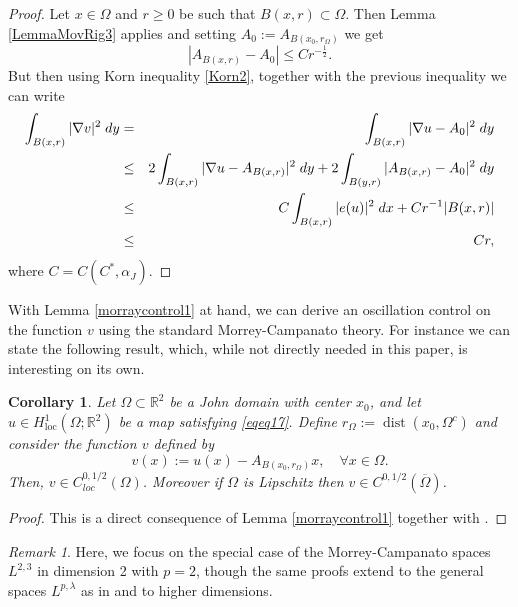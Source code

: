 \documentclass[12pt]{article}
\newtheorem{corollary}[theorem]{Corollary}
\theoremstyle{definition}
\theoremstyle{remark}
\newtheorem{remark}[theorem]{Remark}
\numberwithin{equation}{section}
\DeclareMathOperator{\dist}{dist}
\newcommand{\R}{\mathbb{R}}
\begin{document}
\begin{proof} Let $x\in \Omega$ and $r\geq 0$ be such that $B(x,r)\subset \Omega$. Then Lemma \ref{LemmaMovRig3} applies and setting $A_0:=A_{B(x_0, r_\Omega)}$ we get
    \[ |A_{B(x,r)} - A_{0}|\leq Cr^{-\frac{1}{2}}.\]
    But then using Korn inequality \eqref{Korn2}, together with the previous inequality we can write
    \begin{eqnarray}
        \int_{B(x,r)}|\nabla v|^2 \; dy &=&\int_{B(x,r)}|\nabla u -A_{0}|^2 \; dy  \notag \\
                                        &\leq & 2 \int_{B(x,r)}|\nabla u -A_{B(x,r)}|^2 \; dy +2 \int_{B(y,r)}| A_{B(x,r)}-A_{0}|^2 \; dy  \notag \\
                                        &\leq &  C \int_{B(x,r)}|e(u)|^2 \; dx +  C r^{-1} |B(x,r)| \notag \\
                                        &\leq & C r,
    \end{eqnarray}
    where $C=C( C^*,\alpha_J)$. 
\end{proof}

With Lemma \ref{morraycontrol1} at hand, we can derive an oscillation control on the function $v$ using the standard
Morrey-Campanato theory. For instance we can state the following result, which, while not directly needed in this paper,
is interesting on its own.

\begin{corollary}\label{cor_morrey}
    Let $\Omega \subset \R^2$ be a John domain with center $x_0$, and let $u \in H^1_{\mathrm{loc}}(\Omega;\R^2)$ be a map satisfying \eqref{eqeq17}.    Define  $r_\Omega:= \dist(x_0,\Omega^c)$ and consider the function  $v$ defined by    
    \[v(x):=u(x)-A_{B(x_0,r_\Omega)} x, \quad  \forall x \in \Omega.\] 
    Then, $v\in C^{0,1/2}_{loc}(\Omega)$. Moreover if $\Omega$ is Lipschitz then $v\in C^{0,1/2}(\overline{\Omega})$.
\end{corollary} 
\begin{proof} This is a direct consequence of Lemma \ref{morraycontrol1} together with \cite[page 43]{giaquinta}.
\end{proof}

\begin{remark}
    Here, we focus on the special case of the Morrey-Campanato spaces $L^{2,3}$ in dimension 2 with $p=2$,
    though the same proofs extend to the general spaces $L^{p,\lambda}$ as in \cite{giaquinta} and to higher dimensions.
\end{remark}
\end{document}
